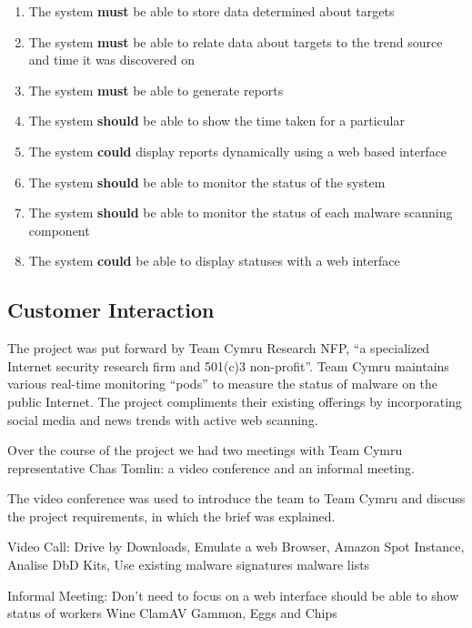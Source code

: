 \begin{enumerate}
    \item The system \textbf{must} be able to store data determined about targets
    \item The system \textbf{must} be able to relate data about targets to the trend source and time it was discovered on
    \item The system \textbf{must} be able to generate reports
    \item The system \textbf{should} be able to show the time taken for a particular 
    \item The system \textbf{could} display reports dynamically using a web based interface
    \item The system \textbf{should} be able to monitor the status of the system
    \item The system \textbf{should} be able to monitor the status of each malware scanning component
    \item The system \textbf{could} be able to display statuses with a web interface
\end{enumerate}

\subsection{Customer Interaction}
The project was put forward by Team Cymru Research NFP, ``a specialized Internet security research firm and 501(c)3 non-profit''\cite{team-cymru}. Team Cymru maintains various real-time monitoring ``pods'' to measure the status of malware on the public Internet. The project compliments their existing offerings by incorporating social media and news trends with active web scanning.

Over the course of the project we had two meetings with Team Cymru representative Chas Tomlin: a video conference and an informal meeting.

The video conference was used to introduce the team to Team Cymru and discuss the project requirements, in which the brief was explained.

Video Call:
    Drive by Downloads,
    Emulate a web Browser,
    Amazon Spot Instance,
    Analise DbD Kits,
    Use existing malware signatures
    malware lists

Informal Meeting:
    Don't need to focus on a web interface
    should be able to show status of workers
    Wine
    ClamAV
    Gammon, Eggs and Chips


